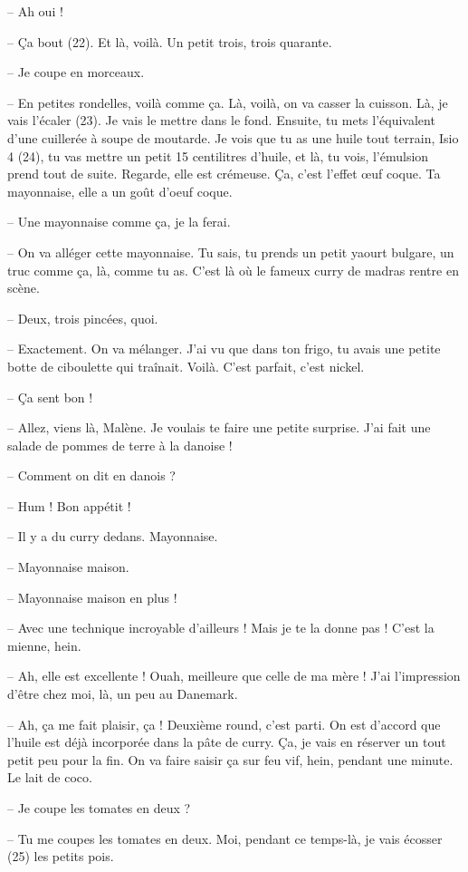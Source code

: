 \documentclass[11pt, french]{report}
\begin{document}
-- Ah oui !

-- Ça bout (22). Et là, voilà. Un petit trois, trois quarante.

-- Je coupe en morceaux.

-- En petites rondelles, voilà comme ça. Là, voilà, on va casser la cuisson. Là, je
vais l’écaler (23). Je vais le mettre dans le fond. Ensuite, tu mets l’équivalent
d’une cuillerée à soupe de moutarde. Je vois que tu as une huile tout terrain,
Isio 4 (24), tu vas mettre un petit 15 centilitres d’huile, et là, tu vois,
l’émulsion prend tout de suite. Regarde, elle est crémeuse. Ça, c’est l’effet œuf
coque. Ta mayonnaise, elle a un goût d’oeuf coque.

-- Une mayonnaise comme ça, je la ferai.

-- On va alléger cette mayonnaise. Tu sais, tu prends un petit yaourt bulgare, un
truc comme ça, là, comme tu as. C’est là où le fameux curry de madras rentre en
scène.

-- Deux, trois pincées, quoi.

-- Exactement. On va mélanger. J’ai vu que dans ton frigo, tu avais une petite
botte de ciboulette qui traînait. Voilà. C’est parfait, c’est nickel.

-- Ça sent bon !

-- Allez, viens là, Malène. Je voulais te faire une petite surprise. J’ai fait
une salade de pommes de terre à la danoise !

-- Comment on dit en danois ?

-- Hum ! Bon appétit !

-- Il y a du curry dedans. Mayonnaise.

-- Mayonnaise maison.

-- Mayonnaise maison en plus !

-- Avec une technique incroyable d’ailleurs ! Mais je te la donne pas ! C’est la
mienne, hein.

-- Ah, elle est excellente ! Ouah, meilleure que celle de ma mère ! J’ai
l’impression d’être chez moi, là, un peu au Danemark.

-- Ah, ça me fait plaisir, ça ! Deuxième round, c’est parti. On est d’accord que
l’huile est déjà incorporée dans la pâte de curry. Ça, je vais en réserver un tout
petit peu pour la fin. On va faire saisir ça sur feu vif, hein, pendant une minute.
Le lait de coco.

-- Je coupe les tomates en deux ?

-- Tu me coupes les tomates en deux. Moi, pendant ce temps-là, je vais écosser (25)
les petits pois.
\end{document}
